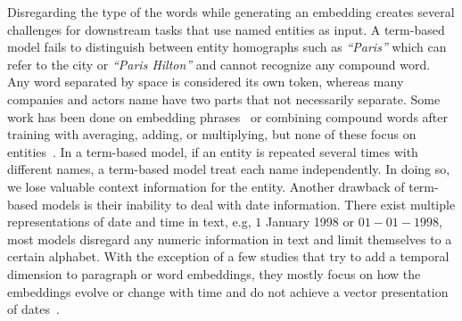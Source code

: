 Disregarding the type of the words while generating an embedding creates several challenges for downstream tasks that use named entities as input. A term-based model fails to distinguish between entity homographs such as  \emph{``Paris''}  which can refer to the city or \emph{``Paris Hilton''} and cannot recognize any compound word. Any word separated by space is considered its own token, whereas many companies and actors name have two parts that not necessarily separate.  Some work has been done on embedding phrases~ or combining compound words after training with averaging, adding, or multiplying, but none of these focus on entities~. In a term-based model, if an entity is repeated several times with different names, a term-based model treat each name independently. In doing so, we lose valuable context information for the entity. Another drawback of term-based models is their inability to deal with date information. There exist multiple representations of date and time in text, e.g, $1$ January 1998 or $01-01-1998$, most models disregard any numeric information in text and limit themselves to a certain alphabet. With the exception of a few studies that try to add a temporal dimension to paragraph or word embeddings, they mostly focus on how the embeddings evolve or change with time and do not achieve a vector presentation of dates~.  \\
